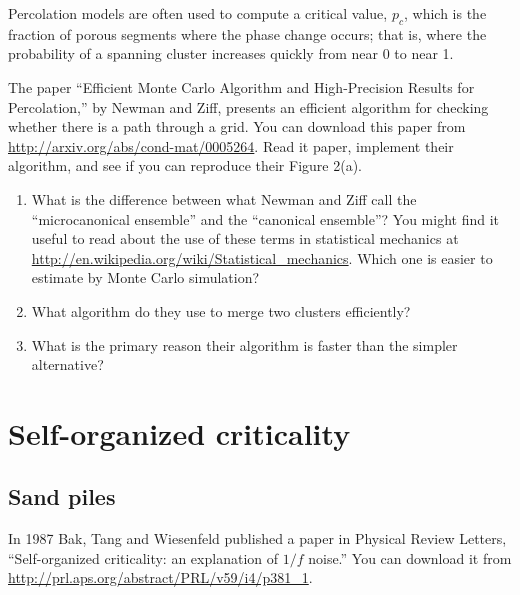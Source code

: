\documentclass[10pt]{book}
\begin{document}
Percolation models are often used to compute a critical value,
$p_c$, which is the fraction of porous segments where the phase
change occurs; that is, where the probability of a spanning cluster
increases quickly from near 0 to near 1.

\begin{exercise}

The paper ``Efficient Monte Carlo Algorithm and High-Precision Results
for Percolation,'' by Newman and Ziff, presents an efficient algorithm
for checking whether there is a path through a grid.  You can download
this paper from \url{http://arxiv.org/abs/cond-mat/0005264}.
Read it
paper, implement their algorithm, and see if you can reproduce their
Figure 2(a).

\begin{enumerate}

\item What is the difference between what Newman and Ziff call the
  ``microcanonical ensemble'' and the ``canonical
  ensemble''?  You might find it useful to read about the use of
    these terms in statistical mechanics at
    \url{http://en.wikipedia.org/wiki/Statistical_mechanics}.  Which one is
  easier to estimate by Monte Carlo simulation?

\item What algorithm do they use to merge two clusters efficiently?

\item What is the primary reason their algorithm is faster than the
  simpler alternative?

\end{enumerate}

\end{exercise}




\chapter{Self-organized criticality}
\label{soc}
 
\section{Sand piles}

In 1987 Bak, Tang and Wiesenfeld published a paper in Physical Review
Letters, ``Self-organized criticality: an explanation of $1/f$ noise.''
You can download it from \url{http://prl.aps.org/abstract/PRL/v59/i4/p381_1}.
\end{document}
